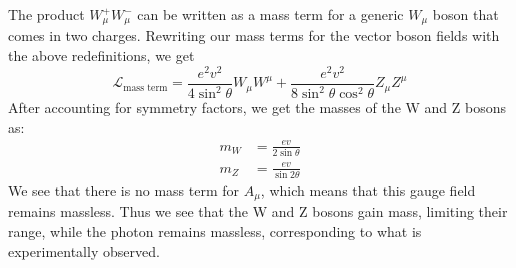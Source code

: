 The product $W_\mu^+W_\mu^-$ can be written as a mass term for a generic $W_\mu$ boson that comes in two charges. Rewriting our mass terms for the vector boson fields with the above redefinitions, we get
\[\mathcal{L}_{\text{mass term}}=\frac{e^2v^2}{4\sin^2\theta}W_\mu W^\mu+
\frac{e^2v^2}{8\sin^2\theta\cos^2\theta}Z_\mu Z^\mu\]
After accounting for symmetry factors, we get the masses of the W and Z bosons as:
\begin{align*}
  m_W &=\frac{ev}{2\sin\theta}\\
  m_Z &=\frac{ev}{\sin2\theta}
\end{align*}
We see that there is no mass term for $A_\mu$, which means that this gauge field remains massless. Thus we see that the W and Z bosons gain mass, limiting their range, while the photon remains massless, corresponding to what is experimentally observed.
